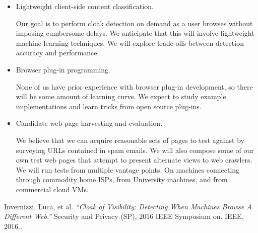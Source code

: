 \documentclass{article}
\begin{document}
\begin{itemize}
\item Lightweight client-side content classification.

Our goal is to perform cloak detection on demand as a user browses
without imposing cumbersome delays.  We anticipate that this will
involve lightweight machine learning techniques.  We will explore
trade-offs between detection accuracy and performance.

\item Browser plug-in programming.

None of us have prior experience with browser plug-in development, so
there will be some amount of learning curve.  We expect to study
example implementations and learn tricks from open source plug-ins.

\item Candidate web page harvesting and evaluation.

We believe that we can acquire reasonable sets of pages to test
against by surveying URLs contained in spam emails. We will also
compose some of our own test web pages that attempt to present
alternate views to web crawlers.  We will run tests from multiple
vantage points: On machines connecting through commodity home ISPs,
from University machines, and from commercial cloud VMs.

\end{itemize}  

\begin{thebibliography}{1}

   Invernizzi, Luca, et al. {\em ``Cloak of Visibility: Detecting When Machines Browse A Different Web.''} Security and Privacy (SP), 2016 IEEE Symposium on. IEEE, 2016..

\end{thebibliography}
\end{document}
